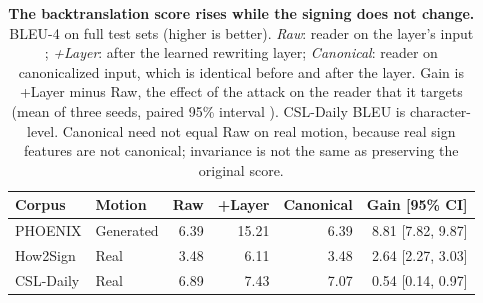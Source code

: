 \begin{table}[t]
\centering\footnotesize\setlength{\tabcolsep}{4pt}
\caption{\textbf{The backtranslation score rises while the signing does not change.} BLEU-4 on full test sets (higher is better). \emph{Raw}: reader on the layer's input ; \emph{+Layer}: after the learned rewriting layer; \emph{Canonical}: reader on canonicalized input, which is identical before and after the layer. Gain is +Layer minus Raw, the effect of the attack on the reader that it targets (mean of three seeds, paired 95\%  interval ).  CSL-Daily BLEU is character-level. Canonical need not equal Raw on real motion, because real sign features are not canonical; invariance is not the same as preserving the original score.}\label{tab:sign}
\begin{tabular}{@{}llrrrr@{}}\toprule
Corpus&Motion&Raw&+Layer&Canonical&Gain [95\% CI]\\\midrule
PHOENIX&Generated&6.39&15.21&6.39&8.81 [7.82, 9.87]\\
How2Sign&Real&3.48&6.11&3.48&2.64 [2.27, 3.03]\\
CSL-Daily&Real&6.89&7.43&7.07&0.54 [0.14, 0.97]\\
\bottomrule\end{tabular}\end{table}
